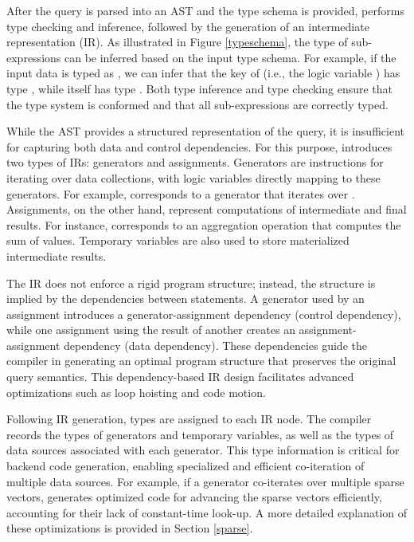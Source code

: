 \documentclass[acmsmall,nonacm]{acmart}\settopmatter{printfolios=true,printccs=false,printacmref=false}
\newcommand{\rhyme}{\text{Rhyme}\xspace}
\begin{document}
\fi
After the query is parsed into an AST and the type schema is provided, \rhyme performs type checking and inference, followed by the generation of an intermediate representation (IR). As illustrated in Figure \ref{typeschema}, the type of sub-expressions can be inferred based on the input type schema. For example, if the input data is typed as , we can infer that the key of  (i.e., the logic variable \inline{*}) has type , while  itself has type . Both type inference and type checking ensure that the type system is conformed and that all sub-expressions are correctly typed.

While the \rhyme AST provides a structured representation of the query, it is insufficient for capturing both data and control dependencies. For this purpose, \rhyme introduces two types of IRs: generators and assignments. Generators are instructions for iterating over data collections, with logic variables directly mapping to these generators. For example,  corresponds to a generator that iterates over . Assignments, on the other hand, represent computations of intermediate and final results. For instance,  corresponds to an aggregation operation that computes the sum of  values. Temporary variables are also used to store materialized intermediate results.

The \rhyme IR does not enforce a rigid program structure; instead, the structure is implied by the dependencies between statements. A generator used by an assignment introduces a generator-assignment dependency (control dependency), while one assignment using the result of another creates an assignment-assignment dependency (data dependency). These dependencies guide the \rhyme compiler in generating an optimal program structure that preserves the original query semantics. This dependency-based IR design facilitates advanced optimizations such as loop hoisting and code motion.

Following IR generation, types are assigned to each IR node. The compiler records the types of generators and temporary variables, as well as the types of data sources associated with each generator. This type information is critical for backend code generation, enabling specialized and efficient co-iteration of multiple data sources. For example, if a generator co-iterates over multiple sparse vectors, \rhyme generates optimized code for advancing the sparse vectors efficiently, accounting for their lack of constant-time look-up. A more detailed explanation of these optimizations is provided in Section \ref{sparse}.
\end{document}
